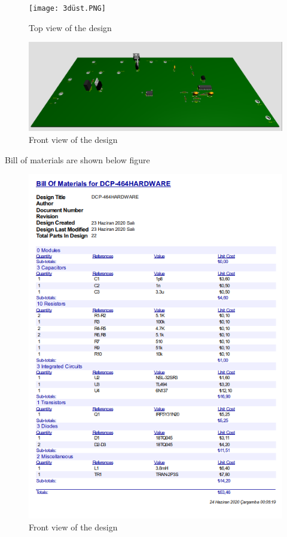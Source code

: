 \documentclass{article}
\begin{document}
\begin{figure}[H]
    \centering
    \texttt{[image: 3düst.PNG]}
    \caption{Top view of the design}
    \label{fig:my_label}
\end{figure}
\begin{figure}[H]
    \centering
    \includegraphics[scale=0.4]{3don.PNG}
    \caption{Front view of the design}
    \label{fig:my_label}
\end{figure}
\newpage
Bill of materials are shown below figure
\begin{figure}[H]
    \centering
    \includegraphics[scale=0.6]{bill.PNG}
    \caption{Front view of the design}
    \label{fig:my_label}
\end{figure}
\newpage
\end{document}
